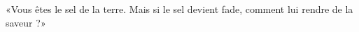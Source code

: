 \encetemps \jesusdisciples
	«Vous êtes le sel de la terre.
Mais si le sel devient fade, comment lui rendre de la saveur ?»
